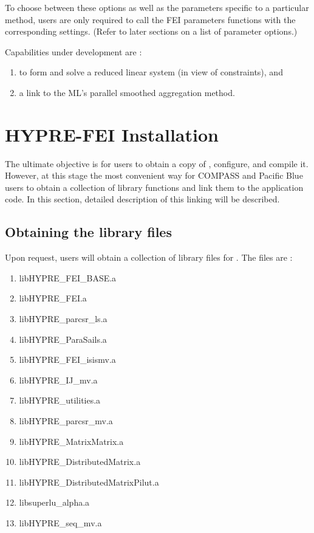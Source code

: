 To choose between these options as well as the parameters specific to a
particular method, users are only required to call the FEI {\sf parameters}
functions with the corresponding settings.  (Refer to later sections on   
a list of parameter options.)

Capabilities under development are :
\begin{enumerate}
\item to form and solve a reduced linear system (in view of constraints), and
\item a link to the ML's parallel smoothed aggregation method.
\end{enumerate}

\section{HYPRE-FEI Installation}

The ultimate objective is for users to obtain a copy of \hypre{}, configure, and
compile it.  However, at this stage the most convenient way for COMPASS and
Pacific Blue users to obtain a collection of library functions and link them
to the application code.  In this section, detailed description of this linking
will be described.

\subsection{Obtaining the library files}

Upon request, users will obtain a collection of library files for \hypre{}.  The
files are :

\begin{enumerate}
\item {\sf libHYPRE\_FEI\_BASE.a}
\item {\sf libHYPRE\_FEI.a}
\item {\sf libHYPRE\_parcsr\_ls.a}
\item {\sf libHYPRE\_ParaSails.a}
\item {\sf libHYPRE\_FEI\_isismv.a}
\item {\sf libHYPRE\_IJ\_mv.a}
\item {\sf libHYPRE\_utilities.a}
\item {\sf libHYPRE\_parcsr\_mv.a}
\item {\sf libHYPRE\_MatrixMatrix.a}
\item {\sf libHYPRE\_DistributedMatrix.a}
\item {\sf libHYPRE\_DistributedMatrixPilut.a}
\item {\sf libsuperlu\_alpha.a}
\item {\sf libHYPRE\_seq\_mv.a}
\end{enumerate}

